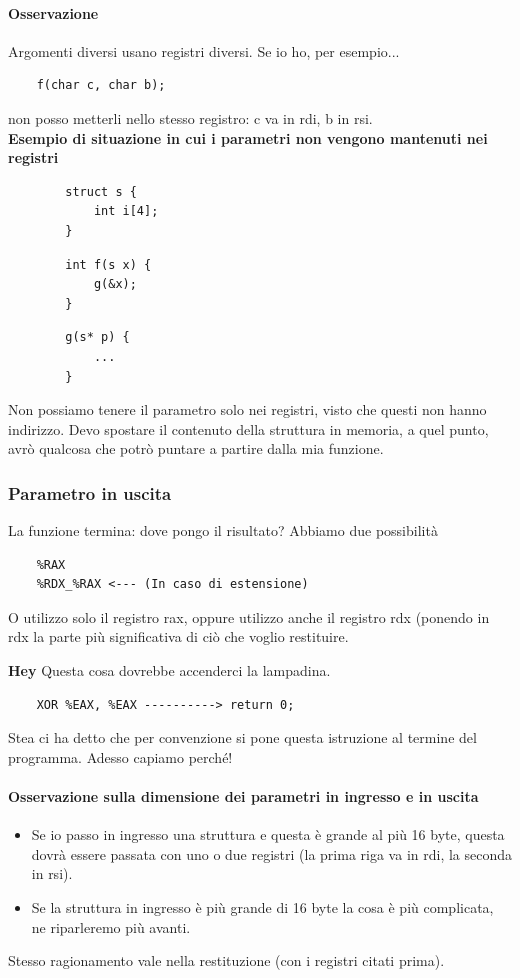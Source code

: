 \paragraph{Osservazione} Argomenti diversi usano registri diversi. Se io ho, per esempio... 
\begin{verbatim}
	f(char c, char b);
\end{verbatim}
non posso metterli nello stesso registro: c va in rdi, b in rsi.\\

\noindent \textbf{Esempio di situazione in cui i parametri non vengono mantenuti nei registri}

\begin{multicols}{3}
	\begin{verbatim}
		struct s {
			int i[4];
		}
	\end{verbatim}
	\begin{verbatim}
		int f(s x) {
			g(&x);
		}
	\end{verbatim}
	\begin{verbatim}
		g(s* p) {
			...
		}
	\end{verbatim}
\end{multicols}
\noindent Non possiamo tenere il parametro solo nei registri, visto che questi non hanno indirizzo. Devo spostare il contenuto della struttura in memoria, a quel punto, avrò qualcosa che potrò puntare a partire dalla mia funzione.

\subsubsection{Parametro in uscita} La funzione termina: dove pongo il risultato? Abbiamo due possibilità
\begin{verbatim}
	%RAX
	%RDX_%RAX <--- (In caso di estensione)
\end{verbatim} 
O utilizzo solo il registro rax, oppure utilizzo anche il registro rdx (ponendo in rdx la parte più significativa di ciò che voglio restituire.\\
\scriptsize

\noindent \textbf{Hey} Questa cosa dovrebbe accenderci la lampadina.
\begin{verbatim}
	XOR %EAX, %EAX ----------> return 0;
\end{verbatim}
Stea ci ha detto che per convenzione si pone questa istruzione al termine del programma. Adesso capiamo perché!
\normalsize
\paragraph{Osservazione sulla dimensione dei parametri in ingresso e in uscita} 
\begin{itemize}
	\item Se io passo in ingresso una struttura e questa è grande al più 16 byte, questa dovrà essere passata con uno o due registri (la prima riga va in rdi, la seconda in rsi). 
	\item Se la struttura in ingresso è più grande di 16 byte la cosa è più complicata, ne riparleremo più avanti. 
\end{itemize}
Stesso ragionamento vale nella restituzione (con i registri citati prima).




